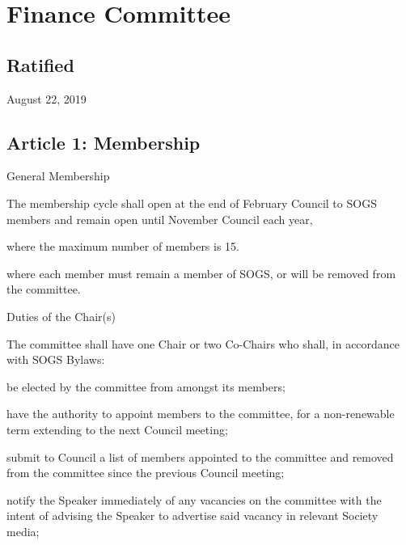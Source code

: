 \section{Finance Committee}

\subsection{Ratified}
August 22, 2019

\subsection{Article 1: Membership}
\begin{longenum}[ label*=\thesubsection.\arabic*., align=left] 
\item General Membership
	\begin{longenum}[ label*=\arabic*., align=left]
	\item The membership cycle shall open at the end of February Council to SOGS members and remain open until November Council  each year, 
		\begin{longenum}[ label*=\arabic*., align=left]
		\item where the maximum number of members is 15.
		\item where each member must remain a member of SOGS, or will be removed from the committee.
		\end{longenum}
	\end{longenum}
\item Duties of the Chair(s)
	\begin{longenum}[ label*=\arabic*., align=left]
	\item The committee shall have one Chair or two Co-Chairs who shall, in accordance with SOGS Bylaws:
		\begin{longenum}[ label*=\arabic*., align=left]
		\item be elected by the committee from amongst its members;
		\item have the authority to appoint members to the committee, for a non-renewable term extending to the next Council meeting;
			\begin{longenum}[ label*=\arabic*., align=left]
			\item submit to Council a list of members appointed to the committee and removed from the committee since the previous Council meeting;
			\item notify the Speaker immediately of any vacancies on the committee with the intent of advising the Speaker to advertise said vacancy in relevant Society media;

\end{longenum}
\end{longenum}
\end{longenum}
\end{longenum}
